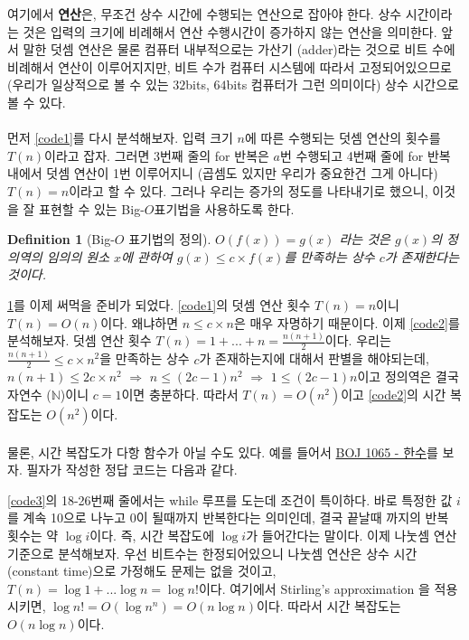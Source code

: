 \documentclass{article}
\newtheorem{definition}{Definition}
\begin{document}
        여기에서 \textbf{연산}은, 무조건 상수 시간에 수행되는 연산으로 잡아야 한다.
        상수 시간이라는 것은 입력의 크기에 비례해서 연산 수행시간이 증가하지 않는 연산을 의미한다.
        앞서 말한 덧셈 연산은 물론 컴퓨터 내부적으로는 가산기 (adder)라는 것으로 비트 수에 비례해서 연산이 이루어지지만, 비트 수가 컴퓨터 시스템에 따라서 고정되어있으므로 (우리가 일상적으로 볼 수 있는 $32$bits, $64$bits 컴퓨터가 그런 의미이다) 상수 시간으로 볼 수 있다. \\ \\
        먼저 \ref{code1}를 다시 분석해보자. 입력 크기 $n$에 따른 수행되는 덧셈 연산의 횟수를 $T(n)$이라고 잡자. 그러면 3번째 줄의 for 반복은 $a$번 수행되고 4번째 줄에 for 반복 내에서 덧셈 연산이 1번 이루어지니 (곱셈도 있지만 우리가 중요한건 그게 아니다) $T(n) = n$이라고 할 수 있다.
        그러나 우리는 증가의 정도를 나타내기로 했으니, 이것을 잘 표현할 수 있는 Big-$O$표기법을 사용하도록 한다.
        \begin{definition}[Big-$O$ 표기법의 정의]
            \label{def1}
            $O(f(x)) = g(x)$ 라는 것은 $g(x)$의 정의역의 임의의 원소 $x$에 관하여 $g(x) \leq c \times f(x)$를 만족하는 상수 $c$가 존재한다는 것이다.
        \end{definition}
        \ref{def1}를 이제 써먹을 준비가 되었다. \ref{code1}의 덧셈 연산 횟수 $T(n) = n$이니 $T(n) = O(n)$이다. 왜냐하면 $n \leq c \times n$은 매우 자명하기 때문이다.
        이제 \ref{code2}를 분석해보자. 덧셈 연산 횟수 $T(n) = 1 + ... + n = \frac{n(n+1)}{2}$이다. 우리는 $\frac{n(n+1)}{2} \leq c \times n^{2}$을 만족하는 상수 $c$가 존재하는지에 대해서 판별을 해야되는데, $n(n+1) \leq 2c \times n^{2}$ $\Rightarrow$ $n \leq (2c - 1)n^{2}$ $\Rightarrow$ $1 \leq (2c - 1)n$이고 정의역은 결국 자연수 ($\mathbb{N}$)이니 $c = 1$이면 충분하다.
        따라서 $T(n) = O(n^{2})$이고 \ref{code2}의 시간 복잡도는 $O(n^{2})$이다. \\ \\

        물론, 시간 복잡도가 다항 함수가 아닐 수도 있다. 예를 들어서 \href{https://www.acmicpc.net/problem/1065}{BOJ 1065 - 한수}를 보자. 필자가 작성한 정답 코드는 다음과 같다.
        
        \ref{code3}의 18-26번째 줄에서는 while 루프를 도는데 조건이 특이하다. 바로 특정한 값 $i$를 계속 10으로 나누고 0이 될때까지 반복한다는 의미인데, 결국 끝날때 까지의 반복 횟수는 약 $\log{i}$이다. 즉, 시간 복잡도에 $\log{i}$가 들어간다는 말이다.
        이제 나눗셈 연산 기준으로 분석해보자. 우선 비트수는 한정되어있으니 나눗셈 연산은 상수 시간 (constant time)으로 가정해도 문제는 없을 것이고, $T(n) = \log{1} + ... \log{n} = \log{n!}$이다. 여기에서 Stirling's approximation \cite{stirling}을 적용시키면, $\log{n!} = O(\log{n^{n}}) = O(n\log{n})$이다. 따라서 시간 복잡도는 $O(n\log{n})$이다.
    
    
\end{document}

